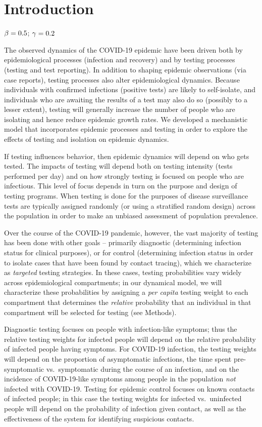 \documentclass[12pt]{article}
\newcommand{\percap}{\emph{per capita}\xspace}
\newcommand{\covid}{COVID-19\xspace}
\DeclareRobustCommand\_{\ifmmode\expandafter\subtxt\else\textunderscore\fi}
\theoremstyle{definition} %
\begin{document}
\section{Introduction}

$\beta=0.5$; $\gamma=0.2$

The observed dynamics of the \covid epidemic have been driven both by epidemiological processes (infection and recovery) and by testing processes (testing and test reporting). In addition to shaping epidemic observations (via case reports), testing processes also alter epidemiological dynamics. Because individuals with confirmed infections (positive tests) are likely to self-isolate, and individuals who are awaiting the results of a test may also do so (possibly to a lesser extent), testing will generally increase the number of people who are isolating and hence reduce epidemic growth rates. We developed a mechanistic model that incorporates epidemic processes and testing in order to explore the effects of testing and isolation on epidemic dynamics.

If testing influences behavior, then epidemic dynamics will depend on who gets tested.
The impacts of testing will depend both on testing intensity (tests performed per day) and on how strongly testing is focused on people who are infectious.
This level of focus depends in turn on the purpose and design of testing programs. 
When testing is done for the purposes of disease surveillance \citep{foddai2020base}
tests are typically assigned randomly (or using a stratified random design) across the population in
order to make an unbiased assessment of population prevalence.

Over the course of the \covid pandemic, however, the vast majority of testing has been done with other goals --
primarily diagnostic (determining infection status for clinical purposes), or for control (determining  infection status in order to isolate cases that have been found by contact tracing), which we characterize as \emph{targeted} testing strategies.
In these cases, testing probabilities vary widely across epidemiological compartments; in our dynamical model, we will characterize these probabilities by assigning a \percap testing weight to each compartment that determines the \emph{relative} probability that an individual in that compartment will be selected for testing (see Methods). 

Diagnostic testing focuses on people with infection-like symptoms; thus the relative testing weights for infected people will depend on the relative probability of infected people having symptoms. For \covid infection, the testing weights will depend on the proportion of asymptomatic infections, the time spent pre-symptomatic vs.\ symptomatic during the course of an infection, and on the incidence of \covid-like symptoms among people in the population \emph{not} infected with \covid. Testing for epidemic control focuses on known contacts of infected people; in this case the testing weights for infected vs.\ uninfected people will depend on the probability of infection given contact, as well as the effectiveness of the system for identifying suspicious contacts.
\end{document}
